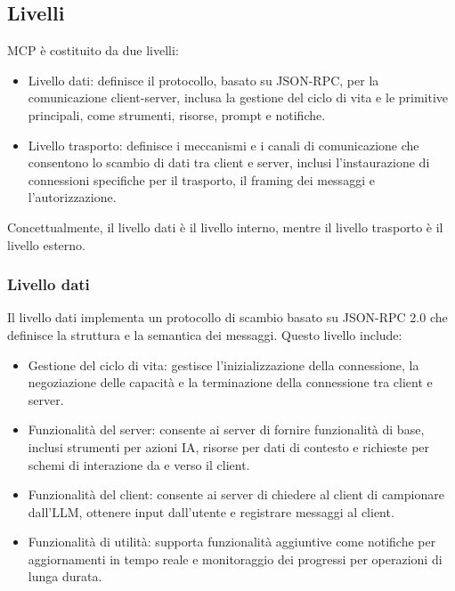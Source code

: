 \subsection{Livelli}
MCP è costituito da due livelli:
\begin{itemize}
\item Livello dati: definisce il protocollo, basato su JSON-RPC, per la comunicazione client-server, inclusa la gestione del ciclo di vita e le primitive principali, come strumenti, risorse, prompt e notifiche.
\item Livello trasporto: definisce i meccanismi e i canali di comunicazione che consentono lo scambio di dati tra client e server, inclusi l'instaurazione di connessioni specifiche per il trasporto, il framing dei messaggi e l'autorizzazione.
\end{itemize}
Concettualmente, il livello dati è il livello interno, mentre il livello trasporto è il livello esterno.
\cite{modelcontextprotocol2024arch}

\subsubsection{Livello dati}
Il livello dati implementa un protocollo di scambio basato su JSON-RPC 2.0 che definisce la struttura e la semantica dei messaggi. Questo livello include:
\begin{itemize}
\item Gestione del ciclo di vita: gestisce l'inizializzazione della connessione, la negoziazione delle capacità e la terminazione della connessione tra client e server.
\item Funzionalità del server: consente ai server di fornire funzionalità di base, inclusi strumenti per azioni IA, risorse per dati di contesto e richieste per schemi di interazione da e verso il client.
\item Funzionalità del client: consente ai server di chiedere al client di campionare dall'LLM, ottenere input dall'utente e registrare messaggi al client.
\item Funzionalità di utilità: supporta funzionalità aggiuntive come notifiche per aggiornamenti in tempo reale e monitoraggio dei progressi per operazioni di lunga durata.
\cite{modelcontextprotocol2024arch}
\end{itemize}

